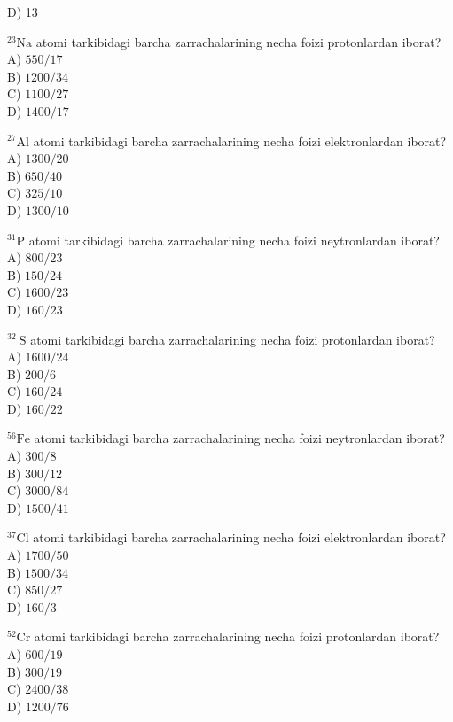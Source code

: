 D) 13
  \item ${ }^{23} \mathrm{Na}$ atomi tarkibidagi barcha zarrachalarining necha foizi protonlardan iborat?\\
A) $550 / 17$\\
B) $1200 / 34$\\
C) $1100 / 27$\\
D) $1400 / 17$
  \item ${ }^{27} \mathrm{Al}$ atomi tarkibidagi barcha zarrachalarining necha foizi elektronlardan iborat?\\
A) $1300 / 20$\\
B) $650 / 40$\\
C) $325 / 10$\\
D) $1300 / 10$
  \item ${ }^{31} \mathrm{P}$ atomi tarkibidagi barcha zarrachalarining necha foizi neytronlardan iborat?\\
A) $800 / 23$\\
B) $150 / 24$\\
C) $1600 / 23$\\
D) $160 / 23$
  \item ${ }^{32} \mathrm{~S}$ atomi tarkibidagi barcha zarrachalarining necha foizi protonlardan iborat?\\
A) $1600 / 24$\\
B) $200 / 6$\\
C) $160 / 24$\\
D) $160 / 22$
  \item ${ }^{56} \mathrm{Fe}$ atomi tarkibidagi barcha zarrachalarining necha foizi neytronlardan iborat?\\
A) $300 / 8$\\
B) $300 / 12$\\
C) $3000 / 84$\\
D) $1500 / 41$
  \item ${ }^{37} \mathrm{Cl}$ atomi tarkibidagi barcha zarrachalarining necha foizi elektronlardan iborat?\\
A) $1700 / 50$\\
B) $1500 / 34$\\
C) $850 / 27$\\
D) $160 / 3$
  \item ${ }^{52} \mathrm{Cr}$ atomi tarkibidagi barcha zarrachalarining necha foizi protonlardan iborat?\\
A) $600 / 19$\\
B) $300 / 19$\\
C) $2400 / 38$\\
D) $1200 / 76$
